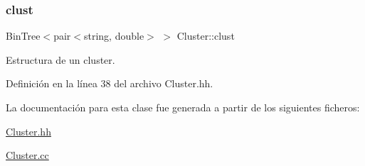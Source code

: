 \subsubsection{\texorpdfstring{clust}{clust}}
{\footnotesize\ttfamily Bin\+Tree$<$pair$<$string, double$>$ $>$ Cluster\+::clust\hspace{0.3cm}{\ttfamily [private]}}



Estructura de un cluster. 



Definición en la línea 38 del archivo Cluster.\+hh.



La documentación para esta clase fue generada a partir de los siguientes ficheros\+:\begin{DoxyCompactItemize}
\item 
\hyperlink{_cluster_8hh}{Cluster.\+hh}\item 
\hyperlink{_cluster_8cc}{Cluster.\+cc}\end{DoxyCompactItemize}
